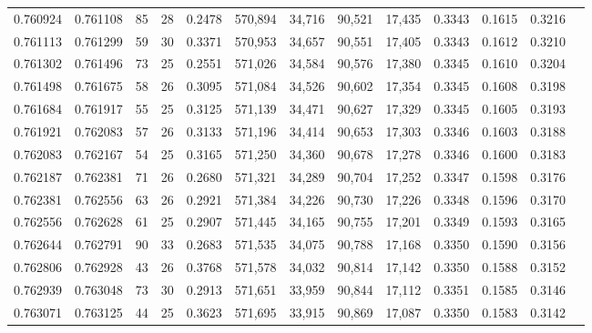 \begin{tabular}{rrrrrrrrrrrrr}
0.760924 & 0.761108 &    85 &  28 &                                     0.2478 & 570,894 &  34,716 &  90,521 &  17,435 & 0.3343 & 0.1615 & 0.3216 \\
0.761113 & 0.761299 &    59 &  30 &                                     0.3371 & 570,953 &  34,657 &  90,551 &  17,405 & 0.3343 & 0.1612 & 0.3210 \\
0.761302 & 0.761496 &    73 &  25 &                                     0.2551 & 571,026 &  34,584 &  90,576 &  17,380 & 0.3345 & 0.1610 & 0.3204 \\
0.761498 & 0.761675 &    58 &  26 &                                     0.3095 & 571,084 &  34,526 &  90,602 &  17,354 & 0.3345 & 0.1608 & 0.3198 \\
0.761684 & 0.761917 &    55 &  25 &                                     0.3125 & 571,139 &  34,471 &  90,627 &  17,329 & 0.3345 & 0.1605 & 0.3193 \\
0.761921 & 0.762083 &    57 &  26 &                                     0.3133 & 571,196 &  34,414 &  90,653 &  17,303 & 0.3346 & 0.1603 & 0.3188 \\
0.762083 & 0.762167 &    54 &  25 &                                     0.3165 & 571,250 &  34,360 &  90,678 &  17,278 & 0.3346 & 0.1600 & 0.3183 \\
0.762187 & 0.762381 &    71 &  26 &                                     0.2680 & 571,321 &  34,289 &  90,704 &  17,252 & 0.3347 & 0.1598 & 0.3176 \\
0.762381 & 0.762556 &    63 &  26 &                                     0.2921 & 571,384 &  34,226 &  90,730 &  17,226 & 0.3348 & 0.1596 & 0.3170 \\
0.762556 & 0.762628 &    61 &  25 &                                     0.2907 & 571,445 &  34,165 &  90,755 &  17,201 & 0.3349 & 0.1593 & 0.3165 \\
0.762644 & 0.762791 &    90 &  33 &                                     0.2683 & 571,535 &  34,075 &  90,788 &  17,168 & 0.3350 & 0.1590 & 0.3156 \\
0.762806 & 0.762928 &    43 &  26 &                                     0.3768 & 571,578 &  34,032 &  90,814 &  17,142 & 0.3350 & 0.1588 & 0.3152 \\
0.762939 & 0.763048 &    73 &  30 &                                     0.2913 & 571,651 &  33,959 &  90,844 &  17,112 & 0.3351 & 0.1585 & 0.3146 \\
0.763071 & 0.763125 &    44 &  25 &                                     0.3623 & 571,695 &  33,915 &  90,869 &  17,087 & 0.3350 & 0.1583 & 0.3142 \\

\end{tabular}
